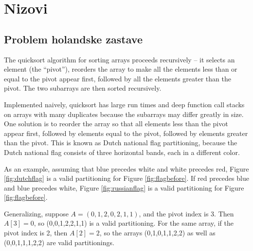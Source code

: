 \documentclass[11pt,a4paper]{article}
\begin{document}
\section{Nizovi}

\subsection{Problem holandske zastave}

The quicksort algorithm for sorting arrays proceeds recursively -- it selects
an element (the ``pivot''), reorders the array to make all the elements less
than or equal to the pivot appear first, followed by all the elements greater
than the pivot. The two subarrays are then sorted recursively.

Implemented naively, quicksort has large run times and deep function call
stacks on arrays with many duplicates because the subarrays may differ
greatly in size. One solution is to reorder the array so that all elements
less than the pivot appear first, followed by elements equal to the pivot,
followed by elements greater than the pivot. This is known as Dutch national
flag partitioning, because the Dutch national flag consists of three
horizontal bands, each in a different color.

As an example, assuming that blue precedes white and white precedes red,
Figure \ref{fig:dutchflag} is a valid partitioning for Figure
\ref{fig:flagbefore}. If red precedes blue and blue precedes white, Figure
\ref{fig:russianflag} is a valid partitioning for Figure \ref{fig:flagbefore}.

Generalizing, suppose $A = (0,1,2,0,2,1,1)$, and the pivot index is 3. Then 
$A[3] = 0$, so (0,0,1,2,2,1,1) is a valid partitioning. For the same array,
if the pivot index is 2, then $A[2] = 2$, so the arrays (0,1,0,1,1,2,2) as 
well as (0,0,1,1,1,2,2) are valid partitionings.
\end{document}
